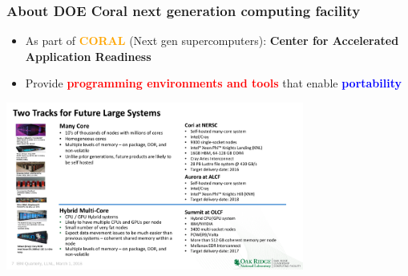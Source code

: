 \begin{frame}
  \frametitle{About DOE Coral next generation computing facility}

  \begin{itemize}
  \item As part of \textcolor{orange}{\textbf{CORAL}} (Next gen supercomputers): \textbf{Center for Accelerated Application Readiness}
  \item Provide \textcolor{red}{\textbf{programming environments and tools}} that enable \textcolor{blue}{\textbf{portability}}
  \end{itemize}
  
  \begin{center}
    \includegraphics[height=5.5cm]{doc/perf_portability/1-02_Straatsma_7}
  \end{center}
  
\end{frame}

